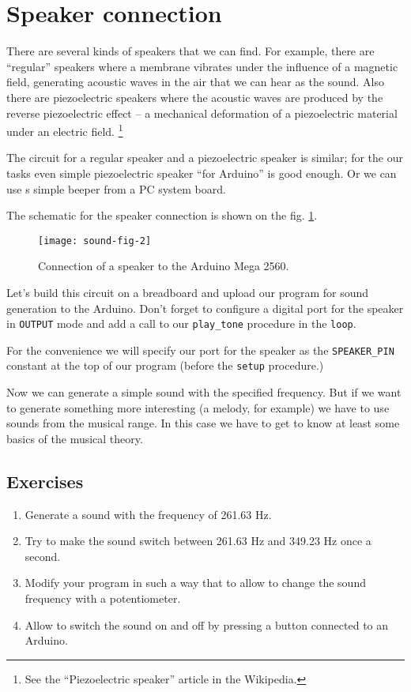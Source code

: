 \documentclass[../sparc.tex]{subfiles}
\begin{document}
\section{Speaker connection}

There are several kinds of speakers that we can find.  For example, there are
``regular'' speakers where a membrane vibrates under the influence of a magnetic
field, generating acoustic waves in the air that we can hear as the sound.  Also
there are piezoelectric speakers where the acoustic waves are produced by the
reverse piezoelectric effect -- a mechanical deformation of a piezoelectric
material under an electric field. \footnote{See the ``Piezoelectric speaker''
article in the Wikipedia.}

The circuit for a regular speaker and a piezoelectric speaker is similar; for
the our tasks even simple piezoelectric speaker ``for Arduino'' is good enough.
Or we can use s simple beeper from a PC system board.

The schematic for the speaker connection is shown on the
fig. \ref{fig:sound-fig-2}.

\begin{figure}[h]
  \centering
  \texttt{[image: sound-fig-2]}
  \caption{Connection of a speaker to the Arduino Mega 2560.}
  \label{fig:sound-fig-2}
\end{figure}

Let's build this circuit on a breadboard and upload our program for sound
generation to the Arduino.  Don't forget to configure a digital port for the
speaker in \texttt{OUTPUT} mode and add a call to our \texttt{play\_tone}
procedure in the \texttt{loop}.

For the convenience we will specify our port for the speaker as the
\texttt{SPEAKER\_PIN} constant at the top of our program (before the
\texttt{setup} procedure.)

Now we can generate a simple sound with the specified frequency.  But if we want
to generate something more interesting (a melody, for example) we have to use
sounds from the musical range.  In this case we have to get to know at least
some basics of the musical theory.

\subsection{Exercises}
\begin{enumerate}
\item Generate a sound with the frequency of 261.63 Hz.
\item Try to make the sound switch between 261.63 Hz and 349.23 Hz once a
  second.
\item Modify your program in such a way that to allow to change the sound
  frequency with a potentiometer.
\item Allow to switch the sound on and off by pressing a button connected to an
  Arduino.
\end{enumerate}
\end{document}
